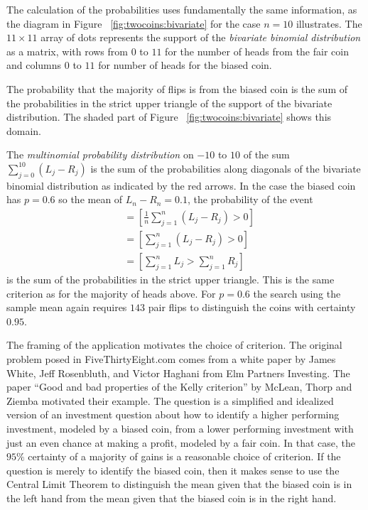 \documentclass[12pt]{article}
\begin{document}
The calculation of the probabilities uses fundamentally the same
information, as the diagram in Figure~%
\ref{fig:twocoins:bivariate} for the case \( n = 10 \) illustrates.  The
\( 11 \times 11 \) array of dots represents the support of the \emph{bivariate
binomial distribution} as a matrix, with rows from \( 0 \) to \( 11 \)
for the number of heads from the fair coin and columns \( 0 \) to \( 11 \)
for number of heads for the biased coin.

The probability that the majority of flips is from the biased coin is
the sum of the probabilities in the strict upper triangle of the support
of the bivariate distribution.  The shaded part of Figure~%
\ref{fig:twocoins:bivariate} shows this domain.

The \emph{multinomial probability distribution}%
on \( -10 \) to \( 10 \) of the sum \( \sum\limits_{j=0}^{10} (L_j-R_j) \)
is the sum of the probabilities along diagonals of the bivariate
binomial distribution as indicated by the red arrows.  In the case the
biased coin has \( p=0.6 \) so the mean of \( L_n - R_n = 0.1 \), the
probability of the event
\begin{align*}
    [S_n > 0] &= \left[\frac{1}{n} \sum\limits_{j=1}^n (L_j-R_j) > 0
    \right] \\
    &= \left[\sum\limits_{j=1}^n (L_j-R_j) > 0 \right] \\
    &= \left[\sum\limits_{j=1}^n L_j > \sum\limits_{j=1}^n R_j \right]
\end{align*}
is the sum of the probabilities in the strict upper triangle.  This is
the same criterion as for the majority of heads above.  For \( p = 0.6 \)
the search using the sample mean again requires \( 143 \) pair flips to
distinguish the coins with certainty \( 0.95 \).

The framing of the application motivates the choice of criterion.  The
original problem posed in FiveThirtyEight.com comes from a white paper
by James White, Jeff Rosenbluth, and Victor Haghani from Elm Partners
Investing.  The paper ``Good and bad properties of the Kelly criterion''
by McLean, Thorp and Ziemba motivated their example.  The question is a
simplified and idealized version of an investment question about how to
identify a higher performing investment, modeled by a biased coin, from
a lower performing investment with just an even chance at making a
profit, modeled by a fair coin.  In that case, the \( 95\% \) certainty
of a majority of gains is a reasonable choice of criterion.  If the
question is merely to identify the biased coin, then it makes sense to
use the Central Limit Theorem to distinguish the mean given that the
biased coin is in the left hand from the mean given that the biased coin
is in the right hand.
\end{document}
